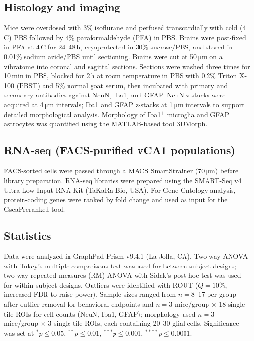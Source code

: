 \documentclass[11pt]{article}
\begin{document}
\subsection{Histology and imaging}
Mice were overdosed with 3\% isoflurane and perfused transcardially with cold (4\,\textdegree C) PBS followed by 4\% paraformaldehyde (PFA) in PBS. Brains were post-fixed in PFA at 4\,\textdegree C for 24--48\,h, cryoprotected in 30\% sucrose/PBS, and stored in 0.01\% sodium azide/PBS until sectioning. Brains were cut at 50\,\si{\micro\meter} on a vibratome into coronal and sagittal sections. Sections were washed three times for 10\,min in PBS, blocked for 2\,h at room temperature in PBS with 0.2\% Triton X-100 (PBST) and 5\% normal goat serum, then incubated with primary and secondary antibodies against NeuN, Iba1, and GFAP. NeuN z-stacks were acquired at 4\,\si{\micro\meter} intervals; Iba1 and GFAP z-stacks at 1\,\si{\micro\meter} intervals to support detailed morphological analysis. Morphology of Iba1$^{+}$ microglia and GFAP$^{+}$ astrocytes was quantified using the MATLAB-based tool 3DMorph.

\subsection{RNA-seq (FACS-purified vCA1 populations)}
FACS-sorted cells were passed through a MACS SmartStrainer (70\,\si{\micro\meter}) before library preparation. RNA-seq libraries were prepared using the SMART-Seq v4 Ultra Low Input RNA Kit (TaKaRa Bio, USA). For Gene Ontology analysis, protein-coding genes were ranked by fold change and used as input for the GseaPreranked tool.

\subsection{Statistics}
Data were analyzed in GraphPad Prism v9.4.1 (La Jolla, CA). Two-way ANOVA with Tukey's multiple comparisons test was used for between-subject designs; two-way repeated-measures (RM) ANOVA with Sidak's post-hoc test was used for within-subject designs. Outliers were identified with ROUT ($Q=10\%$, increased FDR to raise power). Sample sizes ranged from $n=8$--17 per group after outlier removal for behavioral endpoints and $n=3$ mice/group $\times$ 18 single-tile ROIs for cell counts (NeuN, Iba1, GFAP); morphology used $n=3$ mice/group $\times$ 3 single-tile ROIs, each containing 20--30 glial cells. Significance was set at $^{*}p\leq 0.05$, $^{**}p\leq 0.01$, $^{***}p\leq 0.001$, $^{****}p\leq 0.0001$.
\end{document}
